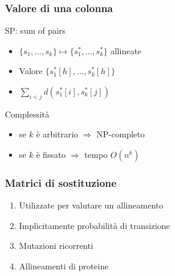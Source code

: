 \begin{frame}[fragile]
\frametitle{Valore di una colonna}
\begin{block}{SP: sum of pairs}
\begin{itemize}[<+->]
\item
$\{s_{1}, \ldots , s_{k}\} \mapsto \{s^{*}_{1}, \ldots , s^{*}_{k}\}$ allineate
\item
Valore $\{s^{*}_{1}[h], \ldots , s^{*}_{k}[h]\}$
\item
$\sum_{i<j} d(s^{*}_{1}[i], s^{*}_{k}[j])$
\end{itemize}
\end{block}
\begin{block}{Complessità}
\begin{itemize}[<+->]
\item
se $k$ è arbitrario $\Rightarrow$ NP-completo
\item
se $k$ è fissato $\Rightarrow$ tempo $O(n^{k})$
\end{itemize}
\end{block}
\end{frame}

\begin{frame}[fragile]
\frametitle{Matrici di sostituzione}
\begin{enumerate}
\item
Utilizzate per valutare un allineamento
\item
Implicitamente probabilità di transizione
\item
Mutazioni ricorrenti
\item
Allineamenti di proteine
\end{enumerate}
\end{frame}

